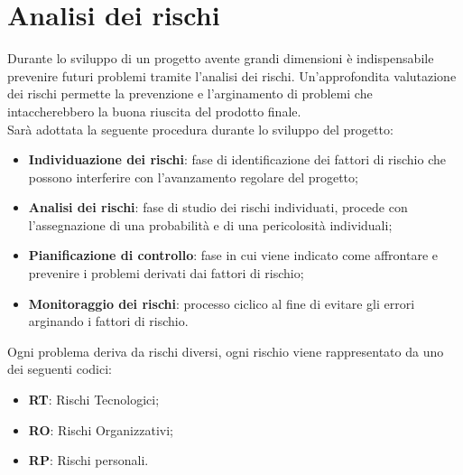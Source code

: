 \section{Analisi dei rischi}

Durante lo sviluppo di un progetto avente grandi dimensioni è indispensabile prevenire 
futuri problemi tramite l'analisi dei rischi. Un'approfondita valutazione dei rischi permette la prevenzione e l'arginamento di problemi che intaccherebbero la buona riuscita del prodotto finale.\\
Sarà adottata la seguente procedura durante lo sviluppo del progetto:

\begin{itemize}
	\item \textbf{Individuazione dei rischi}: fase di identificazione dei fattori di rischio che possono interferire con l'avanzamento regolare del progetto;
	\item \textbf{Analisi dei rischi}: fase di studio dei rischi individuati, procede con l'assegnazione di una probabilità e di una pericolosità individuali;
	\item \textbf{Pianificazione di controllo}: fase in cui viene indicato come affrontare e prevenire
	i problemi derivati dai fattori di rischio;
	\item \textbf{Monitoraggio dei rischi}: processo ciclico al fine di evitare gli errori arginando i 
	fattori di rischio.
\end{itemize}
Ogni problema deriva da rischi diversi, ogni rischio viene rappresentato da uno dei seguenti codici:

\begin{itemize}
	\item \textbf{RT}: Rischi Tecnologici;
	\item \textbf{RO}: Rischi Organizzativi;
	\item \textbf{RP}: Rischi personali.
\end{itemize}

